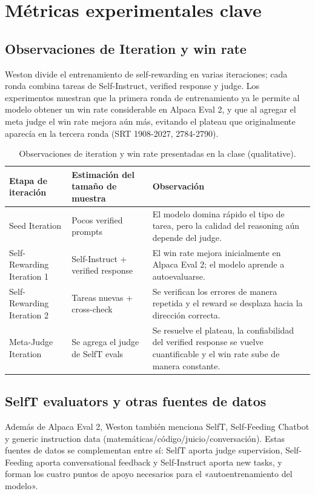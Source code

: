 \section{Métricas experimentales clave}
\subsection{Observaciones de Iteration y win rate}
Weston divide el entrenamiento de self-rewarding en varias iteraciones; cada ronda combina tareas de Self-Instruct, verified response y judge. Los experimentos muestran que la primera ronda de entrenamiento ya le permite al modelo obtener un win rate considerable en Alpaca Eval 2, y que al agregar el meta judge el win rate mejora aún más, evitando el plateau que originalmente aparecía en la tercera ronda (SRT 1908-2027, 2784-2790).

\begin{table}[H]
\centering
\begin{tabular}{p{4cm}p{4cm}p{7cm}}
\toprule
Etapa de iteración & Estimación del tamaño de muestra & Observación \\
\midrule
Seed Iteration & Pocos verified prompts & El modelo domina rápido el tipo de tarea, pero la calidad del reasoning aún depende del judge. \\
Self-Rewarding Iteration 1 & Self-Instruct + verified response & El win rate mejora inicialmente en Alpaca Eval 2; el modelo aprende a autoevaluarse. \\
Self-Rewarding Iteration 2 & Tareas nuevas + cross-check & Se verifican los errores de manera repetida y el reward se desplaza hacia la dirección correcta. \\
Meta-Judge Iteration & Se agrega el judge de SelfT evals & Se resuelve el plateau, la confiabilidad del verified response se vuelve cuantificable y el win rate sube de manera constante. \\
\bottomrule
\end{tabular}
\caption{Observaciones de iteration y win rate presentadas en la clase (qualitative).}
\end{table}

\subsection{SelfT evaluators y otras fuentes de datos}
Además de Alpaca Eval 2, Weston también menciona SelfT, Self-Feeding Chatbot y generic instruction data (matemáticas/código/juicio/conversación). Estas fuentes de datos se complementan entre sí: SelfT aporta judge supervision, Self-Feeding aporta conversational feedback y Self-Instruct aporta new tasks, y forman los cuatro puntos de apoyo necesarios para el «autoentrenamiento del modelo».

